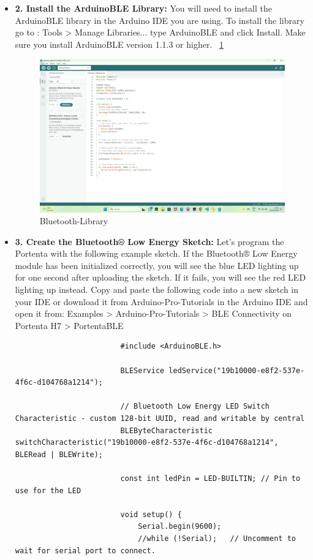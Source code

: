 \begin{itemize}
				\item \textbf{2. Install the ArduinoBLE Library:} You will need to install the ArduinoBLE library in the Arduino IDE you are using. To install the library go to : Tools > Manage Libraries... type ArduinoBLE and click Install. Make sure you install ArduinoBLE version 1.1.3 or higher. ~\ref{Bluetooth-Library}
					\begin{figure}
						\begin{center}
							\includegraphics[width=0.7\linewidth]{Images/PortentaH7/Bluetooth-Library.png}
							\caption{Bluetooth-Library}
							\label{Bluetooth-Library}
						\end{center}
					\end{figure}
				
				\item \textbf{3. Create the Bluetooth® Low Energy Sketch:} Let's program the Portenta with the following example sketch. If the Bluetooth® Low Energy module has been initialized correctly, you will see the blue LED lighting up for one second after uploading the sketch. If it fails, you will see the red LED lighting up instead. Copy and paste the following code into a new sketch in your IDE or download it from Arduino-Pro-Tutorials in the Arduino IDE and open it from: Examples > Arduino-Pro-Tutorials > BLE Connectivity on Portenta H7 > PortentaBLE 
					\begin{lstlisting}
						#include <ArduinoBLE.h>
						
						BLEService ledService("19b10000-e8f2-537e-4f6c-d104768a1214");
						
						// Bluetooth Low Energy LED Switch Characteristic - custom 128-bit UUID, read and writable by central
						BLEByteCharacteristic switchCharacteristic("19b10000-e8f2-537e-4f6c-d104768a1214", BLERead | BLEWrite);
						
						const int ledPin = LED-BUILTIN; // Pin to use for the LED
						
						void setup() {
							Serial.begin(9600);
							//while (!Serial);   // Uncomment to wait for serial port to connect.
							

\end{lstlisting}
\end{itemize}
